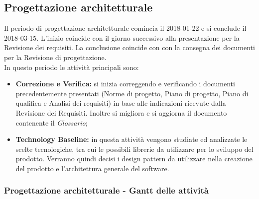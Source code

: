 \subsection{Progettazione architetturale}
Il periodo di progettazione architetturale comincia il 2018-01-22 e si conclude il 2018-03-15. L'inizio coincide con il giorno successivo alla presentazione per la Revisione dei requisiti. La conclusione coincide con con la consegna dei documenti per la Revisione di progettazione. \\
In questo periodo le attività principali sono:
\begin{itemize}
	\item \textbf{Correzione e Verifica:} si inizia correggendo e verificando i documenti precedentemente presentati (Norme di progetto, Piano di progetto, Piano di qualifica e Analisi dei requisiti) in base alle indicazioni ricevute dalla Revisione dei Requisiti. Inoltre si migliora e si aggiorna il documento contenente il \textit{Glossario};
	\item \textbf{Technology Baseline:} in questa attività vengono studiate ed analizzate le scelte tecnologiche, tra cui le possibili librerie da utilizzare per lo sviluppo del prodotto. Verranno quindi decisi i design pattern da utilizzare nella creazione del prodotto e l'architettura generale del software.
\end{itemize}

\subsubsection{Progettazione architetturale - Gantt delle attività}

\pagebreak